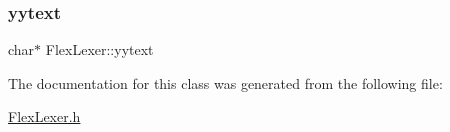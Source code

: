 \mbox{\label{classFlexLexer_a31e594872cba4bb896011d3ee1f75f0d}} 
\subsubsection{\texorpdfstring{yytext}{yytext}}
{\footnotesize\ttfamily char$\ast$ Flex\+Lexer\+::yytext\hspace{0.3cm}{\ttfamily [protected]}}



The documentation for this class was generated from the following file\+:\begin{DoxyCompactItemize}
\item 
\hyperlink{FlexLexer_8h}{Flex\+Lexer.\+h}\end{DoxyCompactItemize}
